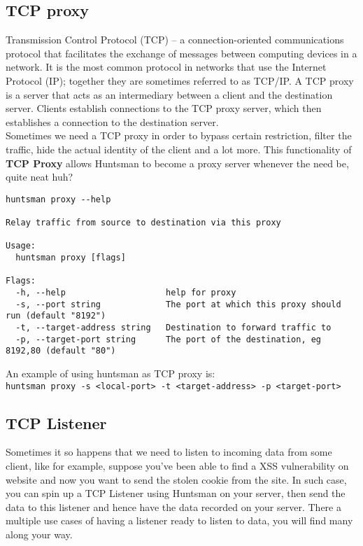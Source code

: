 \documentclass[12pt]{article}
\begin{document}
\subsection{TCP proxy}
Transmission Control Protocol (TCP) – a connection-oriented communications protocol that facilitates the exchange of messages between computing devices in a network. It is the most common protocol in networks that use the Internet Protocol (IP); together they are sometimes referred to as TCP/IP.
A TCP proxy is a server that acts as an intermediary between a client and the destination server. Clients establish connections to the TCP proxy server, which then establishes a connection to the destination server.\\
Sometimes we need a TCP proxy in order to bypass certain restriction, filter the traffic, hide the actual identity of the client and a lot more. This functionality of \textbf{TCP Proxy} allows Huntsman to become a proxy server whenever the need be, quite neat huh?
\begin{verbatim}
huntsman proxy --help                                      

Relay traffic from source to destination via this proxy

Usage:
  huntsman proxy [flags]

Flags:
  -h, --help                    help for proxy
  -s, --port string             The port at which this proxy should run (default "8192")
  -t, --target-address string   Destination to forward traffic to
  -p, --target-port string      The port of the destination, eg 8192,80 (default "80")
\end{verbatim}

An example of using huntsman as TCP proxy is:\\
\verb|huntsman proxy -s <local-port> -t <target-address> -p <target-port>|

\subsection{TCP Listener}
Sometimes it so happens that we need to listen to incoming data from some client, like for example, suppose you've been able to find a XSS vulnerability on website and now you want to send the stolen cookie from the site. In such case, you can spin up a TCP Listener using Huntsman on your server, then send the data to this listener and hence have the data recorded on your server. There a multiple use cases of having a listener ready to listen to data, you will find many along your way.
\end{document}
